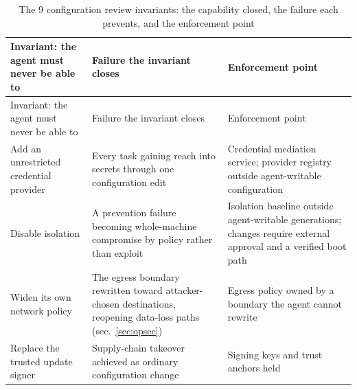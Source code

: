\documentclass[
  english,
  9pt,
]{extarticle}
\begin{document}
\begin{longtable}[]{@{}
  >{\raggedright\arraybackslash}p{}
  >{\raggedright\arraybackslash}p{}
  >{\raggedright\arraybackslash}p{}@{}}
\caption{The 9 configuration review invariants: the capability closed,
the failure each prevents, and the enforcement
point}\label{tbl:invariants}\tabularnewline
\toprule\noalign{}
\begin{minipage}[b]{\linewidth}\raggedright
Invariant: the agent must never be able to
\end{minipage} & \begin{minipage}[b]{\linewidth}\raggedright
Failure the invariant closes
\end{minipage} & \begin{minipage}[b]{\linewidth}\raggedright
Enforcement point
\end{minipage} \\
\midrule\noalign{}
\endfirsthead
\toprule\noalign{}
\begin{minipage}[b]{\linewidth}\raggedright
Invariant: the agent must never be able to
\end{minipage} & \begin{minipage}[b]{\linewidth}\raggedright
Failure the invariant closes
\end{minipage} & \begin{minipage}[b]{\linewidth}\raggedright
Enforcement point
\end{minipage} \\
\midrule\noalign{}
\endhead
\bottomrule\noalign{}
\endlastfoot
Add an unrestricted credential provider & Every task gaining reach into
secrets through one configuration edit & Credential mediation service;
provider registry outside agent-writable configuration \\
Disable isolation & A prevention failure becoming whole-machine
compromise by policy rather than exploit & Isolation baseline outside
agent-writable generations; changes require external approval and a
verified boot path \\
Widen its own network policy & The egress boundary rewritten toward
attacker-chosen destinations, reopening data-loss paths
(sec.~\ref{sec:opsec}) & Egress policy owned by a boundary the agent
cannot rewrite \\
Replace the trusted update signer & Supply-chain takeover achieved as
ordinary configuration change & Signing keys and trust anchors held

\end{longtable}
\end{document}
